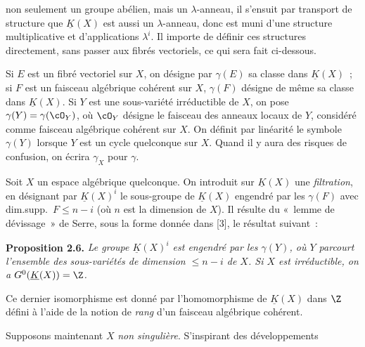 non
seulement un groupe abélien, mais un $\lambda$-anneau, il s'ensuit par transport de structure que $\underline{K}(X)$ est aussi un $\lambda$-anneau, donc est muni d'une structure multiplicative et d'applications $\lambda^i$. Il importe de définir ces structures directement, sans passer aux fibrés vectoriels, ce qui sera fait ci-dessous.

Si $E$ est un fibré vectoriel sur $X$, on désigne par $\gamma(E)$ sa classe dans $\underline{K}(X)$~; si $F$ est un faisceau algébrique cohérent sur $X$, $\gamma(F)$ désigne de même sa classe dans $\underline{K}(X)$. Si $Y$ est une sous-variété irréductible de $X$, on pose $\gamma(Y)=\gamma(\cO_Y)$, où $\cO_Y$ désigne le faisceau des anneaux locaux de $Y$, considéré comme faisceau algébrique cohérent sur $X$. On définit par linéarité le symbole $\gamma(Y)$ lorsque $Y$ est un cycle quelconque sur $X$. Quand il y aura des risques de confusion, on écrira $\gamma_X$ pour $\gamma$.

Soit $X$ un espace algébrique quelconque. On introduit sur $\underline{K}(X)$ une \emph{filtration}, en désignant par $\underline{K}(X)^i$ le sous-groupe de $\underline{K}(X)$ engendré par les $\gamma(F)$ avec dim.supp.\ $F\leq n-i$ (où $n$ est la dimension de $X$). Il résulte du «~lemme de dévissage~» de Serre, sous la forme donnée dans [3], le résultat suivant~:

\textbf{Proposition 2.6.} \emph{Le groupe $\underline{K}(X)^i$ est engendré par les $\gamma(Y)$, où $Y$ parcourt l'ensemble des sous-variétés de dimension $\leq n-i$ de $X$. Si $X$ est irréductible, on a $G^0(\underline{K}(X))=\Z$.}

Ce dernier isomorphisme est donné par l'homomorphisme de $\underline{K}(X)$ dans $\Z$ défini à l'aide de la notion de \emph{rang} d'un faisceau algébrique cohérent.

Supposons maintenant $X$ \emph{non singulière}. S'inspirant des développements 
